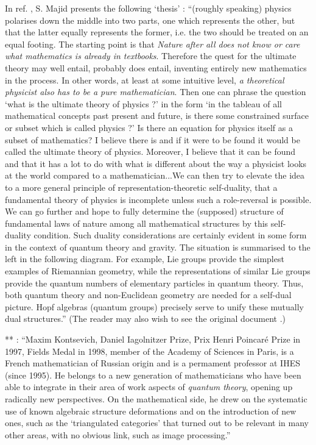 \documentclass[12pt]{article}
\theoremstyle{plain}
\theoremstyle{definition}
\numberwithin{equation}{section}
\begin{document}
In ref. \cite{SM91}, S. Majid presents the following `thesis' : ``(roughly speaking) physics polarises down the middle into two parts, one which represents the other, but that the latter equally represents the former, i.e. the two should be treated on an equal footing. The starting point is that {\em Nature after all does not know or care what mathematics is already in textbooks}. Therefore the quest for the ultimate theory may well entail, probably does entail, inventing entirely new mathematics in the process. In other words, at least at some intuitive level, {\em a theoretical physicist also has to be a pure mathematician}. Then one can phrase the question `what is the ultimate theory of physics ?' in the form `in the tableau of all mathematical concepts past present and future, is there some constrained surface or subset which is called physics ?' Is there an equation for physics itself as a subset of mathematics? I believe there is and if it were to be found it would be called the ultimate theory of physics. Moreover, I believe that it can be found and that it has a lot to do with what is different about the way a physicist looks at the world compared to a mathematician...We can then try to elevate the idea to a more general principle of representation-theoretic self-duality, that a fundamental theory of physics is incomplete unless such a role-reversal is possible. We can go further and hope to fully determine the (supposed) structure of fundamental laws of nature among all mathematical structures by this self-duality condition. Such duality considerations are certainly evident in some form in the context of quantum theory and gravity. The situation is summarised to the left in the following diagram. For example, Lie groups provide the simplest examples of Riemannian geometry, while the representations of similar Lie groups provide the quantum numbers of elementary particles in quantum theory. Thus, both quantum theory and non-Euclidean geometry are needed for a self-dual picture. Hopf algebras (quantum groups) precisely serve to unify these mutually dual structures.'' 
(The reader may also wish to see the original document 
.)



** :
``Maxim Kontsevich, Daniel Iagolnitzer Prize, Prix Henri Poincar\'e Prize in 1997, Fields Medal in 1998, member of the Academy of Sciences in Paris, is a French mathematician of Russian origin and is a permament professor at IHES (since 1995). He belongs to a new generation of mathematicians who have been able to integrate in their area of work aspects of \emph{quantum theory}, opening up radically new perspectives. On the mathematical side, he drew on the systematic use of known algebraic structure deformations and on the introduction of new ones, such as the `triangulated categories' that turned out to be relevant in many other areas, with no obvious link, such as image processing.''
\end{document}
